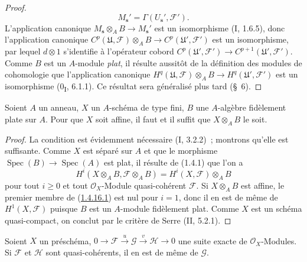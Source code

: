 \begin{proof}
\[M_{\mathbf s}'=\Gamma(U_{\mathbf s}',\mathcal F').
\]
L'application canonique
$M_{\mathbf s}\otimes_A B\to M_{\mathbf s}'$ est un isomorphisme
(I, 1.6.5), donc l'application canonique
$C^p(\mathfrak U,\mathcal F)\otimes_A B\to
C^p(\mathfrak U',\mathcal F')$ est un isomorphisme, par lequel
$d\otimes1$ s'identifie à l'opérateur cobord
$C^p(\mathfrak U',\mathcal F')\to C^{p+1}(\mathfrak U',\mathcal F')$.
Comme $B$ est un $A$-module \emph{plat}, il résulte aussitôt de la définition
des modules de cohomologie que l'application canonique
$H^q(\mathfrak U,\mathcal F)\otimes_A B\to
H^q(\mathfrak U',\mathcal F')$ est un isomorphisme
(0\textsubscript{I}, 6.1.1). Ce résultat sera généralisé plus tard (\S~6).
\end{proof}

\begin{corollary}[1.4.16]
\label{III.1.4.16-fr}
Soient $A$ un anneau, $X$ un $A$-schéma de type fini, $B$ une $A$-algèbre
fidèlement plate sur $A$. Pour que $X$ soit affine, il faut et il suffit que
$X\otimes_A B$ le soit.
\end{corollary}

\begin{proof}
La condition est évidemment nécessaire (I, 3.2.2)~; montrons qu'elle est
suffisante. Comme $X$ est séparé sur $A$ et que le morphisme
$\operatorname{Spec}(B)\to\operatorname{Spec}(A)$ est plat, il résulte de
(1.4.1) que l'on a
\begin{equation}
\label{III.1.4.16.1-fr}
\tag{1.4.16.1}
H^i(X\otimes_A B,\mathcal F\otimes_A B)
=H^i(X,\mathcal F)\otimes_A B
\end{equation}
pour tout $i\geq0$ et tout $\mathcal O_X$-Module quasi-cohérent $\mathcal F$.
Si $X\otimes_A B$ est affine, le premier membre de
(\hyperref[III.1.4.16.1-fr]{1.4.16.1}) est nul pour $i=1$, donc il en est de
même de $H^1(X,\mathcal F)$ puisque $B$ est un $A$-module fidèlement plat.
Comme $X$ est un schéma quasi-compact, on conclut par le critère de Serre
(II, 5.2.1).
\end{proof}

\begin{proposition}[1.4.17]
\label{III.1.4.17-fr}
Soient $X$ un préschéma,
$0\to\mathcal F\xrightarrow{u}\mathcal G\xrightarrow{v}\mathcal H\to0$
une suite exacte de $\mathcal O_X$-Modules. Si $\mathcal F$ et $\mathcal H$
sont quasi-cohérents, il en est de même de $\mathcal G$.
\end{proposition}

